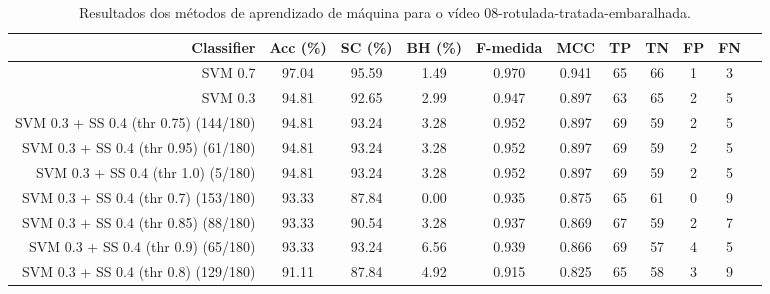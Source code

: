 \begin{table}[!htb]
\centering
\caption{Resultados dos métodos de aprendizado de máquina para o vídeo 08-rotulada-tratada-embaralhada.}
\label{tab:08-rotulada-tratada-embaralhada}
\begin{tabular}{r|c|c|c|c|c|c|c|c|c|c}
\hline\hline
Classifier & Acc (\%) & SC (\%) & BH (\%) & F-medida & MCC & TP & TN & FP & FN \\ \hline
SVM 0.7 & 97.04 & 95.59 & 1.49 & 0.970 & 0.941 & 65 & 66 & 1 & 3 \\ 
SVM 0.3 & 94.81 & 92.65 & 2.99 & 0.947 & 0.897 & 63 & 65 & 2 & 5 \\ 
SVM 0.3 + SS 0.4 (thr 0.75) (144/180) & 94.81 & 93.24 & 3.28 & 0.952 & 0.897 & 69 & 59 & 2 & 5 \\ 
SVM 0.3 + SS 0.4 (thr 0.95) (61/180) & 94.81 & 93.24 & 3.28 & 0.952 & 0.897 & 69 & 59 & 2 & 5 \\ 
SVM 0.3 + SS 0.4 (thr 1.0) (5/180) & 94.81 & 93.24 & 3.28 & 0.952 & 0.897 & 69 & 59 & 2 & 5 \\ 
SVM 0.3 + SS 0.4 (thr 0.7) (153/180) & 93.33 & 87.84 & 0.00 & 0.935 & 0.875 & 65 & 61 & 0 & 9 \\ 
SVM 0.3 + SS 0.4 (thr 0.85) (88/180) & 93.33 & 90.54 & 3.28 & 0.937 & 0.869 & 67 & 59 & 2 & 7 \\ 
SVM 0.3 + SS 0.4 (thr 0.9) (65/180) & 93.33 & 93.24 & 6.56 & 0.939 & 0.866 & 69 & 57 & 4 & 5 \\ 
SVM 0.3 + SS 0.4 (thr 0.8) (129/180) & 91.11 & 87.84 & 4.92 & 0.915 & 0.825 & 65 & 58 & 3 & 9 \\ 
\hline\hline
\end{tabular}
\end{table}

